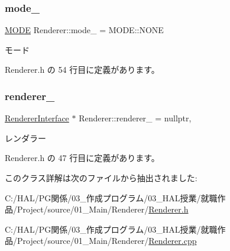 \mbox{\label{class_renderer_adaed44b3c6c8b0879b8cd52f677941cf}} 
\subsubsection{\texorpdfstring{mode\+\_\+}{mode\_}}
{\footnotesize\ttfamily \mbox{\hyperlink{class_renderer_ab5a9379ccadcf2b3394c61cf8c835fec}{M\+O\+DE}} Renderer\+::mode\+\_\+ = M\+O\+D\+E\+::\+N\+O\+NE\hspace{0.3cm}{\ttfamily [private]}}



モード 



 Renderer.\+h の 54 行目に定義があります。

\mbox{\label{class_renderer_a64d00cd885d84ff355228d884c0215dc}} 
\subsubsection{\texorpdfstring{renderer\+\_\+}{renderer\_}}
{\footnotesize\ttfamily \mbox{\hyperlink{class_renderer_interface}{Renderer\+Interface}} $\ast$ Renderer\+::renderer\+\_\+ = nullptr\hspace{0.3cm}{\ttfamily [static]}, {\ttfamily [private]}}



レンダラー 



 Renderer.\+h の 47 行目に定義があります。



このクラス詳解は次のファイルから抽出されました\+:\begin{DoxyCompactItemize}
\item 
C\+:/\+H\+A\+L/\+P\+G関係/03\+\_\+作成プログラム/03\+\_\+\+H\+A\+L授業/就職作品/\+Project/source/01\+\_\+\+Main/\+Renderer/\mbox{\hyperlink{_renderer_8h}{Renderer.\+h}}\item 
C\+:/\+H\+A\+L/\+P\+G関係/03\+\_\+作成プログラム/03\+\_\+\+H\+A\+L授業/就職作品/\+Project/source/01\+\_\+\+Main/\+Renderer/\mbox{\hyperlink{_renderer_8cpp}{Renderer.\+cpp}}\end{DoxyCompactItemize}
